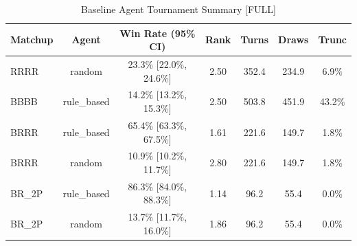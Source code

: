 \begin{table}[ht]
\centering
\caption{Baseline Agent Tournament Summary [FULL]}
\begin{tabular}{lcccccc}
\hline
Matchup & Agent & Win Rate (95\% CI) & Rank & Turns & Draws & Trunc \\
\hline
RRRR & random & 23.3\% [22.0\%, 24.6\%] & 2.50 & 352.4 & 234.9 & 6.9\% \\
BBBB & rule_based & 14.2\% [13.2\%, 15.3\%] & 2.50 & 503.8 & 451.9 & 43.2\% \\
BRRR & rule_based & 65.4\% [63.3\%, 67.5\%] & 1.61 & 221.6 & 149.7 & 1.8\% \\
BRRR & random & 10.9\% [10.2\%, 11.7\%] & 2.80 & 221.6 & 149.7 & 1.8\% \\
BR_2P & rule_based & 86.3\% [84.0\%, 88.3\%] & 1.14 & 96.2 & 55.4 & 0.0\% \\
BR_2P & random & 13.7\% [11.7\%, 16.0\%] & 1.86 & 96.2 & 55.4 & 0.0\% \\
\hline
\end{tabular}
\end{table}
